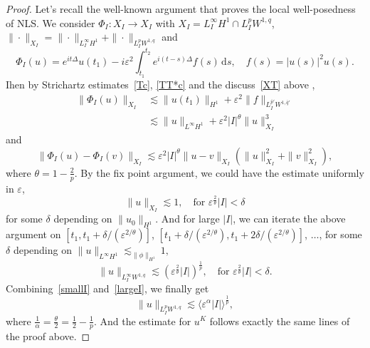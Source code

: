 \documentclass[10pt,a4paper]{article}
\newtheorem{definition}[theorem]{Definition}
\begin{document}
  \begin{proof}
    Let's recall the well-known argument that proves the local well-posedness of
    NLS. We consider \(\Phi_I: X_I \to X_I \) with \(X_I=L_I^\infty H^1
    \cap L^p_I W^{1,q}\), \(\|\cdot\|_{X_I} = \|\cdot\|_{L^\infty_I H^1} +
    \|\cdot\|_{L^p_I W^{1,q}}\) and 
    \[ \Phi_I(u) = e^{it\Delta} u(t_1) - i\varepsilon^2 \int_{t_1}^{t_2} e^{i(t-s)\Delta}
    f(s)\,\mathrm{d}s, \quad f(s)=|u(s)|^2u(s). \]
    Ihen by Strichartz estimates~\eqref{Tc}, \eqref{TT*c} and the discuss~\eqref{XT} above ,
    \begin{align}
      \|\Phi_I(u)\|_{X_I} & \lesssim \|u(t_1)\|_{H^1} + \varepsilon^2
      \|f\|_{L^{\bar{p}'}_I W^{1,\bar{q}'}} \\
      & \lesssim \|u\|_{L^\infty H^1} + \varepsilon^2 |I|^\theta \|u\|_{X_I}^3
    \end{align}
    and 
    \begin{equation}
      \|\Phi_I(u)-\Phi_I(v)\|_{X_I} \lesssim \varepsilon^2 |I|^\theta 
      \|u-v\|_{X_I} (\|u\|_{X_I}^2 + \|v\|_{X_I}^2),
    \end{equation}
    where \( \theta = 1 - \frac2p \). By the fix point argument, we could have
    the estimate uniformly in \(\varepsilon\),
    \begin{equation}\label{smallI}
      \|u\|_{X_I} \lesssim 1,\quad \text{for }\varepsilon^\frac2\theta |I| < \delta
    \end{equation}
    for some \(\delta\) depending on \(\|u_0\|_{H^1}\). And for large \(|I|\),
    we can iterate the above argument on \([t_1,t_1+\delta/(\varepsilon^{2/\theta})]\), 
    \([t_1+\delta/(\varepsilon^{2/\theta}),t_1+2\delta/(\varepsilon^{2/\theta})]\), \(
    \ldots\), for some \(\delta\) depending on \(\|u\|_{L^\infty H^1}
    \lesssim_{\|\phi\|_{H^1}} 1 ,\)
    \begin{equation}\label{largeI}
      \|u\|_{L^\infty_I W^{1,q}} \lesssim (\varepsilon^\frac2\theta |I|)^\frac1p,
    \quad \text{for } \varepsilon^\frac2\theta |I| < \delta.
    \end{equation}
    Combining~\eqref{smallI} and~\eqref{largeI}, we finally get 
    \[ \|u\|_{L^p_I W^{1,q}} \lesssim
    \langle\varepsilon^\alpha |I|\rangle^{\frac1p},\]
    where \(\frac1\alpha=\frac\theta2=\frac12 - \frac1p.\) And the estimate for
    \(u^K\) follows exactly the same lines of the proof above.
  \end{proof}
\end{document}
